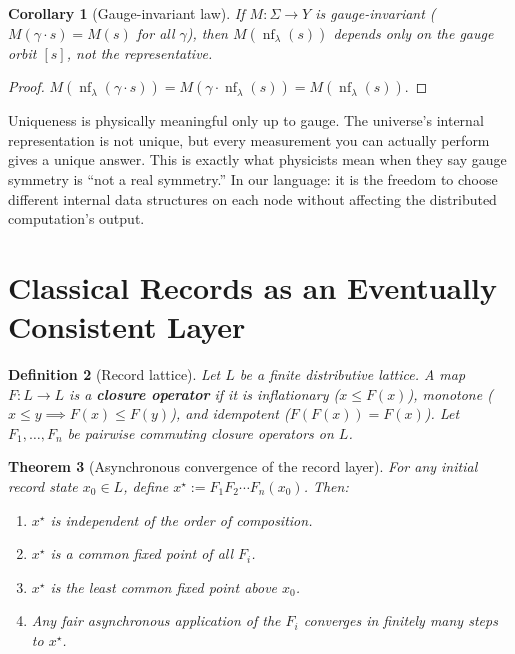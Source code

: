 \documentclass[11pt]{article}
\newtheorem{theorem}{Theorem}[section]
\newtheorem{corollary}[theorem]{Corollary}
\newtheorem{definition}[theorem]{Definition}
\begin{document}
\begin{corollary}[Gauge-invariant law]\label{cor:gaugeinv}
If $M:\Sigma\to Y$ is gauge-invariant ($M(\gamma\cdot s)=M(s)$ for all $\gamma$), then $M(\operatorname{nf}_\lambda(s))$ depends only on the gauge orbit $[s]$, not the representative.
\end{corollary}

\begin{proof}
$M(\operatorname{nf}_\lambda(\gamma\cdot s)) = M(\gamma\cdot\operatorname{nf}_\lambda(s)) = M(\operatorname{nf}_\lambda(s))$.
\end{proof}

Uniqueness is physically meaningful only up to gauge. The universe's internal representation is not unique, but every measurement you can actually perform gives a unique answer. This is exactly what physicists mean when they say gauge symmetry is ``not a real symmetry.'' In our language: it is the freedom to choose different internal data structures on each node without affecting the distributed computation's output.


\section{Classical Records as an Eventually Consistent Layer}

\begin{definition}[Record lattice]\label{def:lattice}
Let $L$ be a finite distributive lattice. A map $F:L\to L$ is a \textbf{closure operator} if it is inflationary ($x\le F(x)$), monotone ($x\le y\implies F(x)\le F(y)$), and idempotent ($F(F(x))=F(x)$). Let $F_1,\dots,F_n$ be pairwise commuting closure operators on $L$.
\end{definition}

\begin{theorem}[Asynchronous convergence of the record layer]\label{thm:crdt}
For any initial record state $x_0\in L$, define $x^\star := F_1 F_2\cdots F_n(x_0)$. Then:
\begin{enumerate}
\item $x^\star$ is independent of the order of composition.
\item $x^\star$ is a common fixed point of all $F_i$.
\item $x^\star$ is the least common fixed point above $x_0$.
\item Any fair asynchronous application of the $F_i$ converges in finitely many steps to $x^\star$.
\end{enumerate}
\end{theorem}
\end{document}
